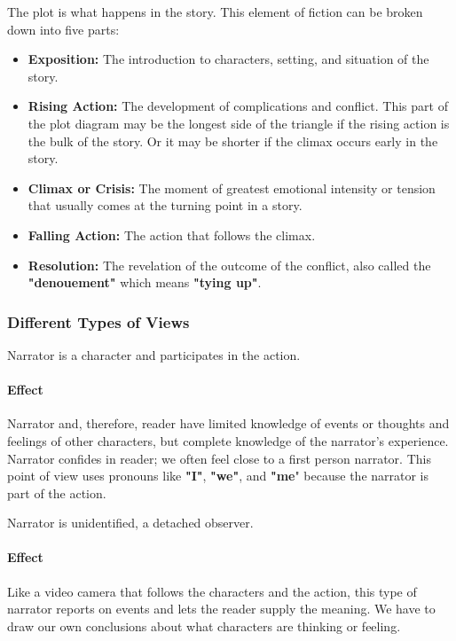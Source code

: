 The plot is what happens in the story. This element of fiction can be broken
down into five parts:

\begin{itemize}
    \item \textbf{Exposition:} The introduction to characters, setting, and
        situation of the story.
    \item \textbf{Rising Action:} The development of complications and
        conflict. This part of the plot diagram may be the longest side of the
        triangle if the rising action is the bulk of the story. Or it may be
        shorter if the climax occurs early in the story.
    \item \textbf{Climax or Crisis:} The moment of greatest emotional intensity
        or tension that usually comes at the turning point in a story.
    \item \textbf{Falling Action:} The action that follows the climax.
    \item \textbf{Resolution:} The revelation of the outcome of the conflict,
        also called the \textbf{"denouement"} which means \textbf{"tying up"}.
\end{itemize}

\subsubsection*{Different Types of Views}

\begin{definition}
    Narrator is a character and participates in the action.
    
    \paragraph{Effect} Narrator and, therefore, reader have limited knowledge
    of events or thoughts and feelings of other characters, but complete
    knowledge of the narrator’s experience. Narrator confides in reader; we
    often feel close to a first person narrator. This point of view uses
    pronouns like \textbf{"I"}, \textbf{"we"}, and \textbf{"me}" because the
    narrator is part of the action.
\end{definition}

\begin{definition}[Objective]
    Narrator is unidentified, a detached observer.
    
    \paragraph{Effect} Like a video camera that follows the characters and the
    action, this type of narrator reports on events and lets the reader supply
    the meaning. We have to draw our own conclusions about what characters are
    thinking or feeling.
\end{definition}

